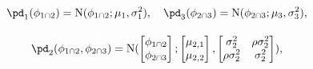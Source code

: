 \begin{equation}
  \begin{gathered}
  \pd_{1}(\phi_{1 \cap 2}) = \text{N}(\phi_{1 \cap 2}; \mu_{1}, \sigma_{1}^{2}), \quad
  \pd_{3}(\phi_{2 \cap 3}) = \text{N}(\phi_{2 \cap 3}; \mu_{3}, \sigma_{3}^{2}), \\[1em]
  \pd_{2}(\phi_{1 \cap 2}, \phi_{2 \cap 3}) = \text{N}(
    \begin{bmatrix} \phi_{1 \cap 2} \\ \phi_{2 \cap 3} \end{bmatrix};
    \begin{bmatrix} \mu_{2, 1} \\ \mu_{2, 2} \end{bmatrix},
    \begin{bmatrix} \sigma_{2}^{2} & \rho \sigma_{2}^{2} \\ \rho \sigma_{2}^{2} & \sigma_{2}^{2} \end{bmatrix}
  ),
  \label{eqn:marginal-gaussian-example}
  \end{gathered}
\end{equation}